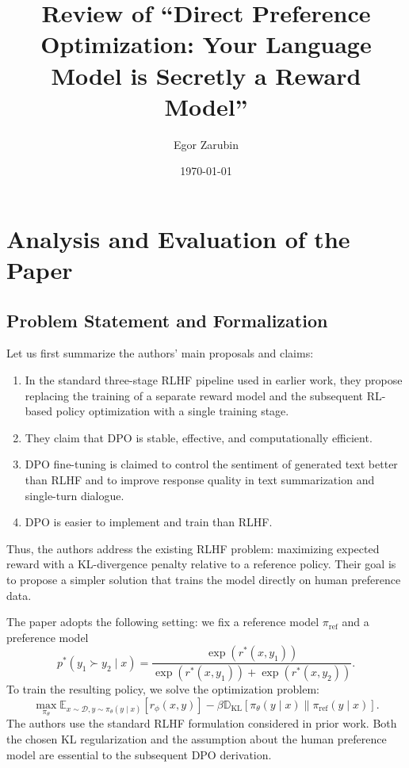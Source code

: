 \documentclass[11pt,a4paper]{article}
\title{\vspace{-1.5cm}\textbf{Review of ``Direct Preference Optimization: Your Language Model is Secretly a Reward Model''}}
\author{Egor Zarubin}
\date{\today}
\theoremstyle{remark}
\begin{document}
\maketitle
\vspace{-0.8cm}

\section{Analysis and Evaluation of the Paper}

\subsection{Problem Statement and Formalization}
Let us first summarize the authors' main proposals and claims:
\begin{enumerate}
    \item In the standard three-stage RLHF pipeline used in earlier work, they propose replacing the training of a separate reward model and the subsequent RL-based policy optimization with a single training stage.
    \item They claim that DPO is stable, effective, and computationally efficient.
    \item DPO fine-tuning is claimed to control the sentiment of generated text better than RLHF and to improve response quality in text summarization and single-turn dialogue.
    \item DPO is easier to implement and train than RLHF.
\end{enumerate}

Thus, the authors address the existing RLHF problem: maximizing expected reward with a KL-divergence penalty relative to a reference policy. Their goal is to propose a simpler solution that trains the model directly on human preference data.

The paper adopts the following setting: we fix a reference model $\pi_{\text{ref}}$ and a preference model
$$p^*(y_1 \succ y_2 \mid x) = \frac{\exp (r^*(x, y_1))}{\exp (r^*(x, y_1)) + \exp (r^*(x, y_2))}.$$
To train the resulting policy, we solve the optimization problem:
$$\max_{\pi_\theta} \mathbb{E}_{x \sim \mathcal{D}, y \sim \pi_\theta(y \mid x)} [r_\phi(x, y)] - \beta \mathbb{D}_{\text{KL}} [\pi_\theta(y \mid x) \parallel \pi_{\text{ref}}(y \mid x)].$$
The authors use the standard RLHF formulation considered in prior work. Both the chosen KL regularization and the assumption about the human preference model are essential to the subsequent DPO derivation.
\end{document}
